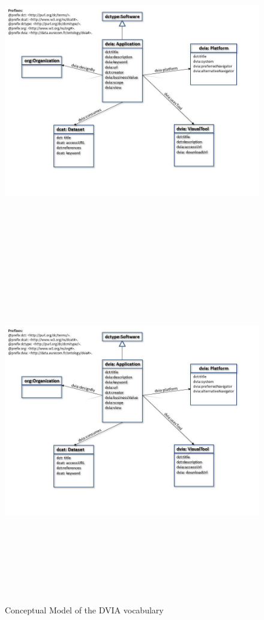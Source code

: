 \documentclass[a4paper,11pt]{report}
\begin{document}
\begin{landscape}
\begin{figure}[!htbp]
  \begin{center}
    \ifpdf
      \includegraphics[height=5in]{visuGraphModel.jpg}
    \else
      \includegraphics[bb = 92 86 545 742, height=6in]{visuGraphModel.jpg}
    \fi
    \caption{Conceptual Model of the DVIA vocabulary }
    \label{visuGraphModel}
  \end{center}
\end{figure}
\end{landscape}
\end{document}
